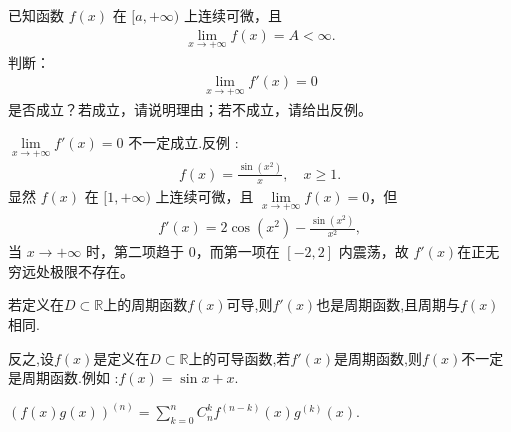 \documentclass[../../main.tex]{subfiles}%
\begin{document}
\begin{example}
已知函数 $f(x)$ 在 $[a, +\infty)$ 上连续可微，且
\begin{align*}
\lim\limits_{x\to +\infty} f(x) = A < \infty.
\end{align*}
判断：
\begin{align*}
\lim\limits_{x\to +\infty} f'(x) = 0
\end{align*}
是否成立？若成立，请说明理由；若不成立，请给出反例。
\end{example}
\begin{solution}

$\lim\limits_{x\to +\infty} f'(x) = 0$ 不一定成立.反例 :
\begin{align*}
f(x) = \frac{\sin(x^2)}{x}, \quad x \geqslant 1.
\end{align*}
显然 $f(x)$ 在 $[1, +\infty)$ 上连续可微，且 $\lim\limits_{x\to +\infty} f(x) = 0$，但
\begin{align*}
f'(x) = 2\cos(x^2) - \frac{\sin(x^2)}{x^2},
\end{align*}
当 $x\to +\infty$ 时，第二项趋于 $0$，而第一项在 $[-2,2]$ 内震荡，故 $f'(x)$在正无穷远处极限不存在。
\end{solution}

\begin{proposition}
若定义在$D\subset \mathbb{R}$上的周期函数$f(x)$可导,则$f'(x)$也是周期函数,且周期与$f(x)$相同.
\end{proposition}
\begin{remark}
反之,设$f(x)$是定义在$D\subset \mathbb{R}$上的可导函数,若$f'(x)$是周期函数,则$f(x)$不一定是周期函数.例如 :$f(x)=\sin x +x$.
\end{remark}

\begin{theorem}[Leibniz公式]\label{theorem:Leibniz公式}
$(f(x)g(x))^{(n)} = \sum_{k = 0}^{n} C_{n}^{k}f^{(n - k)}(x)g^{(k)}(x).$
\end{theorem}
\end{document}
